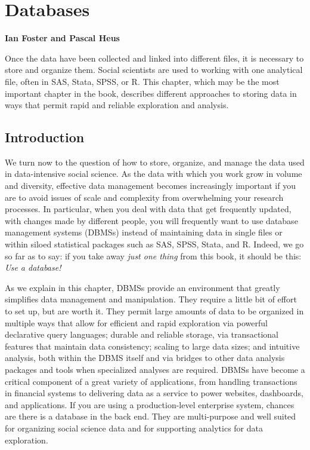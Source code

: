 \documentclass[]{krantz}
\begin{document}
\hypertarget{chap:db}{\chapter{Databases}\label{chap:db}}

\textbf{Ian Foster and Pascal Heus}

Once the data have been collected and linked into different files, it is
necessary to store and organize them. Social scientists are used to
working with one analytical file, often in SAS, Stata, SPSS, or R. This
chapter, which may be the most important chapter in the book, describes
different approaches to storing data in ways that permit rapid and
reliable exploration and analysis.

\section{Introduction}\label{sec:db:intro}

We turn now to the question of how to store, organize, and manage the
data used in data-intensive social science. As the data with which you
work grow in volume and diversity, effective data management becomes
increasingly important if you are to avoid issues of scale and
complexity from overwhelming your research processes. In particular,
when you deal with data that get frequently updated, with changes made
by different people, you will frequently want to use database management
systems (DBMSs) instead of maintaining data in single files or within
siloed statistical packages such as SAS, SPSS, Stata, and R. Indeed, we
go so far as to say: if you take away \emph{just one thing} from this
book, it should be this: \emph{Use a database!}

As we explain in this chapter, DBMSs provide an environment that greatly
simplifies data management and manipulation. They require a little bit
of effort to set up, but are worth it. They permit large amounts of data
to be organized in multiple ways that allow for efficient and rapid
exploration via powerful declarative query languages; durable and
reliable storage, via transactional features that maintain data
consistency; scaling to large data sizes; and intuitive analysis, both
within the DBMS itself and via bridges to other data analysis packages
and tools when specialized analyses are required. DBMSs have become a
critical component of a great variety of applications, from handling
transactions in financial systems to delivering data as a service to
power websites, dashboards, and applications. If you are using a
production-level enterprise system, chances are there is a database in
the back end. They are multi-purpose and well suited for organizing
social science data and for supporting analytics for data exploration.
\end{document}
